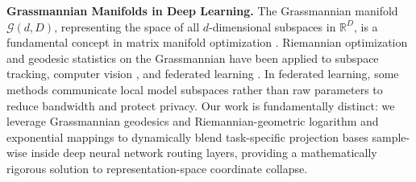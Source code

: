 \textbf{Grassmannian Manifolds in Deep Learning.}
The Grassmannian manifold $\mathcal{G}(d, D)$, representing the space of all $d$-dimensional subspaces in $\mathbb{R}^D$, is a fundamental concept in matrix manifold optimization \cite{absil08, edelman98}. Riemannian optimization and geodesic statistics on the Grassmannian have been applied to subspace tracking, computer vision \cite{fletcher04, pennec06, mu20}, and federated learning \cite{shaji21}. In federated learning, some methods communicate local model subspaces rather than raw parameters to reduce bandwidth and protect privacy. Our work is fundamentally distinct: we leverage Grassmannian geodesics and Riemannian-geometric logarithm and exponential mappings to dynamically blend task-specific projection bases sample-wise inside deep neural network routing layers, providing a mathematically rigorous solution to representation-space coordinate collapse.
